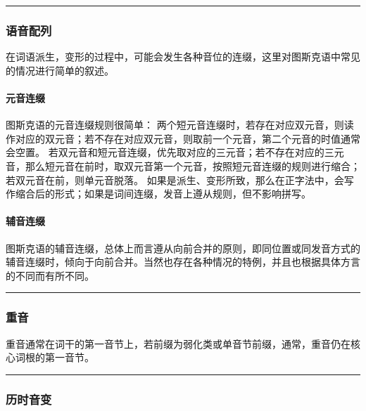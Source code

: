 \documentclass{article}
\begin{document}
\begin{center}\rule{0.5\linewidth}{0.5pt}\end{center}

\subsubsection{语音配列}\label{ux8bedux97f3ux914dux5217}

在词语派生，变形的过程中，可能会发生各种音位的连缀，这里对图斯克语中常见的情况进行简单的叙述。

\paragraph{元音连缀}\label{ux5143ux97f3ux8fdeux7f00}

图斯克语的元音连缀规则很简单：
两个短元音连缀时，若存在对应双元音，则读作对应的双元音；若不存在对应双元音，则取前一个元音，第二个元音的时值通常会空置。
若双元音和短元音连缀，优先取对应的三元音；若不存在对应的三元音，那么短元音在前时，取双元音第一个元音，按照短元音连缀的规则进行缩合；若双元音在前，则单元音脱落。
如果是派生、变形所致，那么在正字法中，会写作缩合后的形式；如果是词间连缀，发音上遵从规则，但不影响拼写。

\paragraph{辅音连缀}\label{ux8f85ux97f3ux8fdeux7f00}

图斯克语的辅音连缀，总体上而言遵从向前合并的原则，即同位置或同发音方式的辅音连缀时，倾向于向前合并。当然也存在各种情况的特例，并且也根据具体方言的不同而有所不同。

\begin{center}\rule{0.5\linewidth}{0.5pt}\end{center}

\subsubsection{重音}\label{ux91cdux97f3}

重音通常在词干的第一音节上，若前缀为弱化类或单音节前缀，通常，重音仍在核心词根的第一音节。

\begin{center}\rule{0.5\linewidth}{0.5pt}\end{center}

\subsubsection{历时音变}\label{ux5386ux65f6ux97f3ux53d8}
\end{document}
